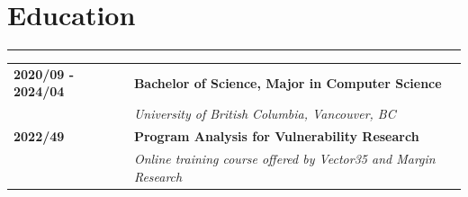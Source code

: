 \documentclass[letterpaper]{article}
\newcommand{\sectcolor}{cyan}
\newcommand{\sect}[1]{\section*{#1}
                        {\color{\sectcolor}
                        \rule{\textwidth}{1pt}
                        \vspace{-7pt}}}
\begin{document}
    \sect{Education}

        \begin{tabular}{p{} p{}}
            \textbf{2020/09 - 2024/04} & \large\textbf{Bachelor of Science, Major in Computer Science} \\
            & \emph{University of British Columbia, Vancouver, BC} \\
            \textbf{2022/49} & \large\textbf{Program Analysis for Vulnerability Research} \\
            & \emph{Online training course offered by Vector35 and Margin Research} \\
        \end{tabular}
\end{document}
